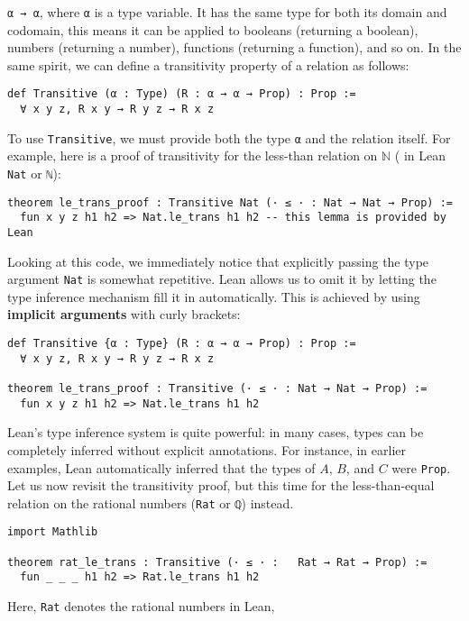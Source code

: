 \lstinline[language=lean]|α → α|, where 
\lstinline[language=lean]|α| is a type variable. 
It has the same type for 
both its domain and codomain, this means it can be 
applied to booleans (returning a boolean), numbers (returning a number), 
functions (returning a function), and so on.
In the same spirit, we can define a transitivity property of a relation as follows:
\begin{lstlisting}[language=lean]
def Transitive (α : Type) (R : α → α → Prop) : Prop :=
  ∀ x y z, R x y → R y z → R x z
\end{lstlisting}
To use \lstinline[language=lean]|Transitive|, we must provide both the type 
\lstinline[language=lean]|α| and the relation itself. 
For example, here is a proof of transitivity for the less-than relation on
 $\mathbb{N}$ ( in Lean \lstinline[language=lean]|Nat| or \lstinline[language=lean]|ℕ|):
\begin{lstlisting}[language=lean]
theorem le_trans_proof : Transitive Nat (· ≤ · : Nat → Nat → Prop) :=
  fun x y z h1 h2 => Nat.le_trans h1 h2 -- this lemma is provided by Lean 
\end{lstlisting}
Looking at this code, we immediately notice that explicitly 
passing the type argument \lstinline[language=lean]|Nat| is somewhat repetitive. 
Lean allows us to omit it by letting the type inference mechanism fill it in automatically.
 This is achieved by using \textbf{implicit arguments} with curly brackets:
\begin{lstlisting}[language=lean]
def Transitive {α : Type} (R : α → α → Prop) : Prop :=
  ∀ x y z, R x y → R y z → R x z

theorem le_trans_proof : Transitive (· ≤ · : Nat → Nat → Prop) :=
  fun x y z h1 h2 => Nat.le_trans h1 h2 
\end{lstlisting}
Lean's type inference system is quite powerful: in many cases, types can be completely 
inferred without explicit annotations. For instance, in earlier examples, Lean automatically 
inferred that the types of $A$, $B$, and $C$ were \lstinline[language=lean]|Prop|.
Let us now revisit the transitivity proof, but this time for the less-than-equal relation on 
the rational numbers (\lstinline[language=lean]|Rat| or \lstinline[language=lean]|ℚ|) instead.
\begin{lstlisting}[language=lean]
import Mathlib

theorem rat_le_trans : Transitive (· ≤ · :   Rat → Rat → Prop) :=
  fun _ _ _ h1 h2 => Rat.le_trans h1 h2
\end{lstlisting}
Here, \lstinline[language=lean]|Rat| denotes the rational numbers in Lean, 
